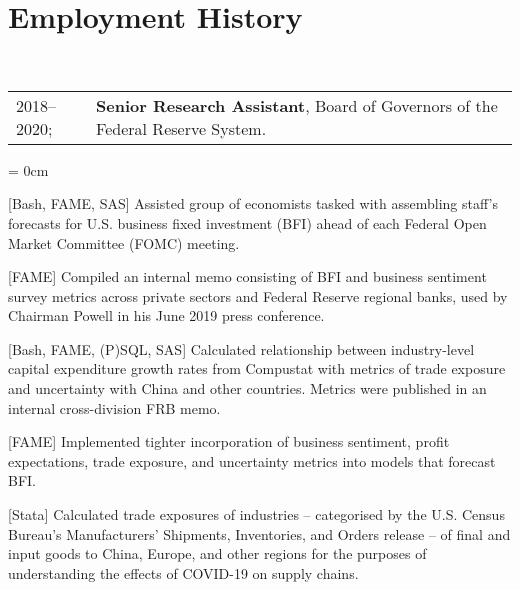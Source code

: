 \documentclass[a4paper, 11pt]{article}
\begin{document}
  \section{Employment History}
  ~\begin{tabular}{ll}
    2018--2020; & \textbf{Senior Research Assistant}, Board of Governors of the Federal Reserve System.
  \end{tabular}
  \begin{compactitem}\parskip = 0cm
    \item {[Bash, FAME, SAS]} Assisted group of economists tasked with assembling staff's forecasts for U.S. business fixed investment (BFI) ahead of each Federal Open Market Committee (FOMC) meeting.
    \item {[FAME]} Compiled an internal memo consisting of BFI and business sentiment survey metrics across private sectors and Federal Reserve regional banks, used by Chairman Powell in his June 2019 press conference.
    \item {[Bash, FAME, (P)SQL, SAS]} Calculated relationship between industry-level capital expenditure growth rates from Compustat with metrics of trade exposure and uncertainty with China and other countries. Metrics were published in an internal cross-division FRB memo.
    \item {[FAME]} Implemented tighter incorporation of business sentiment, profit expectations, trade exposure, and uncertainty metrics into models that forecast BFI.
    \item {[Stata]} Calculated trade exposures of industries -- categorised by the U.S. Census Bureau's Manufacturers' Shipments, Inventories, and Orders release -- of final and input goods to China, Europe, and other regions for the purposes of understanding the effects of COVID-19 on supply chains.
  \end{compactitem}
  \vspace*{1em}
      
\end{document}

